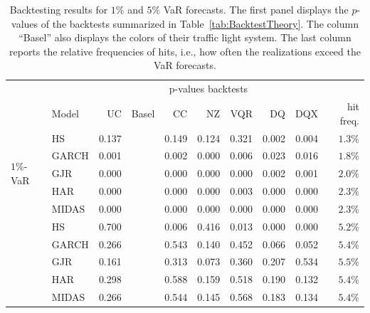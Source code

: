 \begin{table}

\caption{\label{tab:BacktestResults}Backtesting results for $1\%$ and $5\%$ VaR forecasts. The first panel displays the $p$-values of the backtests summarized in Table~\ref{tab:BacktestTheory}. The column ``Basel'' also displays the colors of their traffic light system. The last column reports the relative frequencies of hits, i.e., how often the realizations exceed the VaR forecasts.}
\centering
\begin{tabular}[t]{llrlrrrrrr}
\toprule
\multicolumn{2}{c}{ } & \multicolumn{7}{c}{p-values backtests} & \multicolumn{1}{c}{ } \\
\cmidrule(l{3pt}r{3pt}){3-9}
 & Model & UC & Basel & CC & NZ & VQR & DQ & DQX & hit freq.\\
\midrule
\multirow{5}{*}{$1\%$-VaR} & HS & 0.137 & \cellcolor{Goldenrod!20}{\textcolor{black}{0.024}} & 0.149 & 0.124 & 0.321 & 0.002 & 0.004 & $1.3\%$\\
 & GARCH & 0.001 & \cellcolor{Red!15}{\textcolor{black}{0.000}} & 0.002 & 0.000 & 0.006 & 0.023 & 0.016 & $1.8\%$\\
 & GJR & 0.000 & \cellcolor{Red!15}{\textcolor{black}{0.000}} & 0.000 & 0.000 & 0.000 & 0.002 & 0.001 & $2.0\%$\\
 & HAR & 0.000 & \cellcolor{Red!15}{\textcolor{black}{0.000}} & 0.000 & 0.000 & 0.003 & 0.000 & 0.000 & $2.3\%$\\
 & MIDAS & 0.000 & \cellcolor{Red!15}{\textcolor{black}{0.000}} & 0.000 & 0.000 & 0.000 & 0.000 & 0.000 & $2.3\%$\\
\addlinespace\hline\addlinespace

\addlinespace
\multirow{5}{*}{$5\%$-VaR} & HS & 0.700 & \cellcolor{ForestGreen!15}{\textcolor{black}{0.303}} & 0.006 & 0.416 & 0.013 & 0.000 & 0.000 & $5.2\%$\\
 & GARCH & 0.266 & \cellcolor{ForestGreen!15}{\textcolor{black}{0.117}} & 0.543 & 0.140 & 0.452 & 0.066 & 0.052 & $5.4\%$\\
 & GJR & 0.161 & \cellcolor{ForestGreen!15}{\textcolor{black}{0.069}} & 0.313 & 0.073 & 0.360 & 0.207 & 0.534 & $5.5\%$\\
 & HAR & 0.298 & \cellcolor{ForestGreen!15}{\textcolor{black}{0.132}} & 0.588 & 0.159 & 0.518 & 0.190 & 0.132 & $5.4\%$\\
 & MIDAS & 0.266 & \cellcolor{ForestGreen!15}{\textcolor{black}{0.117}} & 0.544 & 0.145 & 0.568 & 0.183 & 0.134 & $5.4\%$\\
\bottomrule
\end{tabular}
\end{table}
